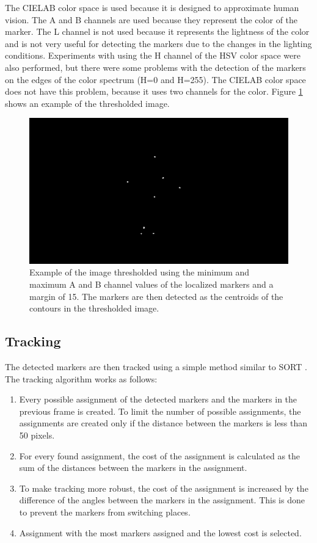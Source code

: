 The CIELAB color space is used because it is designed to approximate human vision. The A and B channels are used because they represent the color of the marker. The L channel is not used because it represents the lightness of the color and is not very useful for detecting the markers due to the changes in the lighting conditions. Experiments with using the H channel of the HSV color space were also performed, but there were some problems with the detection of the markers on the edges of the color spectrum (H=0 and H=255). The CIELAB color space does not have this problem, because it uses two channels for the color. Figure \ref{fig:marker_detection} shows an example of the thresholded image.

\begin{figure}[htbp]
    \centering
    \includegraphics[width=\textwidth]{obrazky-figures/thresholded.png}
    \caption{Example of the image thresholded using the minimum and maximum A and B channel values of the localized markers and a margin of 15. The markers are then detected as the centroids of the contours in the thresholded image.}
    \label{fig:marker_detection}
\end{figure}

\subsection{Tracking}
\label{tracking}
The detected markers are then tracked using a simple method similar to SORT \cite{sort}. The tracking algorithm works as follows:

\begin{enumerate}
    \item Every possible assignment of the detected markers and the markers in the previous frame is created. To limit the number of possible assignments, the assignments are created only if the distance between the markers is less than 50 pixels.
    \item For every found assignment, the cost of the assignment is calculated as the sum of the distances between the markers in the assignment.
    \item To make tracking more robust, the cost of the assignment is increased by the difference of the angles between the markers in the assignment. This is done to prevent the markers from switching places.
    \item Assignment with the most markers assigned and the lowest cost is selected.
\end{enumerate}

